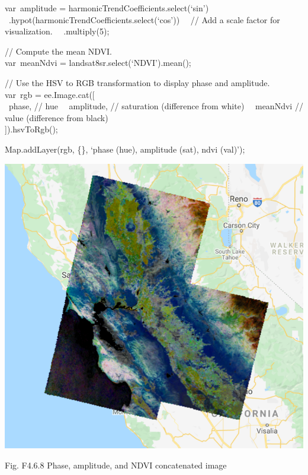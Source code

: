 \documentclass[
  letterpaper,
  DIV=11,
  numbers=noendperiod]{scrreprt}
\begin{document}
var~amplitude = harmonicTrendCoefficients.select(`sin')\\
\hspace*{0.333em} ~.hypot(harmonicTrendCoefficients.select(`cos'))~ ~//
Add a scale factor for visualization.~ ~.multiply(5);

// Compute the mean NDVI.\\
var~meanNdvi = landsat8sr.select(`NDVI').mean();

// Use the HSV to RGB transformation to display phase and amplitude.\\
var~rgb = ee.Image.cat({[}\\
\hspace*{0.333em} ~phase, // hue~ ~amplitude, // saturation (difference
from white)~ ~meanNdvi // value (difference from black)\\
{]}).hsvToRgb();

Map.addLayer(rgb, \{\}, `phase (hue), amplitude (sat), ndvi (val)');

\includegraphics{./F4/image63.png}

Fig. F4.6.8 Phase, amplitude, and NDVI concatenated image
\end{document}
